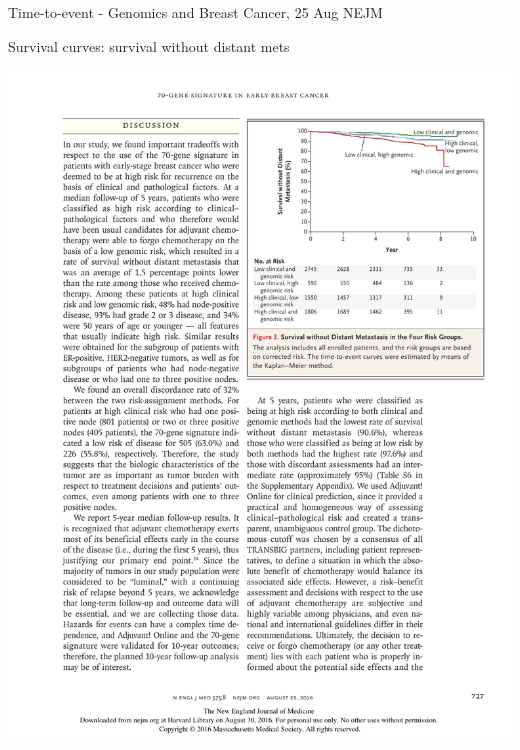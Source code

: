 \documentclass[ignorenonframetext,]{beamer}
\begin{document}
\begin{frame}{Time-to-event - Genomics and Breast Cancer, 25 Aug NEJM}

Survival curves: survival without distant mets

\includegraphics{figures/four_brca_groups.pdf}

\end{frame}
\end{document}
